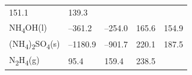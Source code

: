 \documentclass[
  9pt,
]{extbook}
\theoremstyle{definition}
\theoremstyle{definition}
\theoremstyle{definition}
\theoremstyle{remark}
\begin{document}
\begin{longtable}[]{@{}lllll@{}}
\begin{minipage}[t]{0.18\columnwidth}
151.1\strut
\end{minipage} & \begin{minipage}[t]{0.18\columnwidth}\raggedright
139.3\strut
\end{minipage}\tabularnewline
\begin{minipage}[t]{0.10\columnwidth}\raggedright
NH\textsubscript{4}OH(l)\strut
\end{minipage} & \begin{minipage}[t]{0.19\columnwidth}\raggedright
--361.2\strut
\end{minipage} & \begin{minipage}[t]{0.20\columnwidth}\raggedright
--254.0\strut
\end{minipage} & \begin{minipage}[t]{0.18\columnwidth}\raggedright
165.6\strut
\end{minipage} & \begin{minipage}[t]{0.18\columnwidth}\raggedright
154.9\strut
\end{minipage}\tabularnewline
\begin{minipage}[t]{0.10\columnwidth}\raggedright
(NH\textsubscript{4})\textsubscript{2}SO\textsubscript{4}(s)\strut
\end{minipage} & \begin{minipage}[t]{0.19\columnwidth}\raggedright
--1180.9\strut
\end{minipage} & \begin{minipage}[t]{0.20\columnwidth}\raggedright
--901.7\strut
\end{minipage} & \begin{minipage}[t]{0.18\columnwidth}\raggedright
220.1\strut
\end{minipage} & \begin{minipage}[t]{0.18\columnwidth}\raggedright
187.5\strut
\end{minipage}\tabularnewline
\begin{minipage}[t]{0.10\columnwidth}\raggedright
N\textsubscript{2}H\textsubscript{4}(g)\strut
\end{minipage} & \begin{minipage}[t]{0.19\columnwidth}\raggedright
95.4\strut
\end{minipage} & \begin{minipage}[t]{0.20\columnwidth}\raggedright
159.4\strut
\end{minipage} & \begin{minipage}[t]{0.18\columnwidth}\raggedright
238.5\strut
\end{minipage} & \begin{minipage}[t]{0.18\columnwidth}\raggedright

\end{minipage}
\end{longtable}
\end{document}
